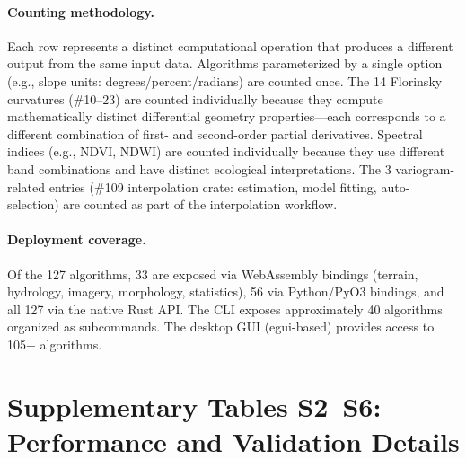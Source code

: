 \documentclass[11pt]{article}
\begin{document}
\paragraph{Counting methodology.} Each row represents a distinct computational operation that produces a different output from the same input data. Algorithms parameterized by a single option (e.g., slope units: degrees/percent/radians) are counted once. The 14 Florinsky curvatures (\#10--23) are counted individually because they compute mathematically distinct differential geometry properties---each corresponds to a different combination of first- and second-order partial derivatives. Spectral indices (e.g., NDVI, NDWI) are counted individually because they use different band combinations and have distinct ecological interpretations. The 3 variogram-related entries (\#109 interpolation crate: estimation, model fitting, auto-selection) are counted as part of the interpolation workflow.

\paragraph{Deployment coverage.} Of the 127 algorithms, 33 are exposed via WebAssembly bindings (terrain, hydrology, imagery, morphology, statistics), 56 via Python/PyO3 bindings, and all 127 via the native Rust API. The CLI exposes approximately 40 algorithms organized as subcommands. The desktop GUI (egui-based) provides access to 105+ algorithms.

\clearpage
\section*{Supplementary Tables S2--S6: Performance and Validation Details}
\end{document}
